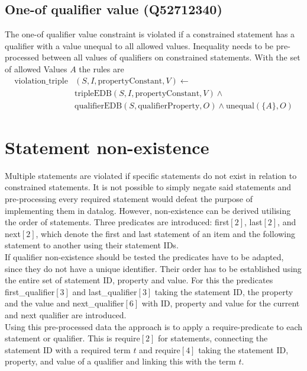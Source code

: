 \documentclass[hyperref,bachelorofscience,fleqn]{cgvpub}
\begin{document}
\subsection{One-of qualifier value (Q52712340)}
The one-of qualifier value constraint is violated if a constrained statement has a qualifier with a value unequal to all allowed values. Inequality needs to be pre-processed between all values of qualifiers on constrained statements. With the set of allowed Values \(A\) the rules are
\begin{equation*}
\begin{split}
\text{violation\_triple}&(S, I, \text{propertyConstant}, V) \leftarrow \\
&\text{tripleEDB}(S, I, \text{propertyConstant}, V) \wedge \\
&\text{qualifierEDB}(S, \text{qualifierProperty}, O) \wedge \text{unequal}(\{A\}, O)
\end{split}
\end{equation*}

\section{Statement non-existence}\label{sec_statement_non-existence}
Multiple statements are violated if specific statements do not exist in relation to constrained statements. It is not possible to simply negate said statements and pre-processing every required statement would defeat the purpose of implementing them in datalog. However, non-existence can be derived utilising the order of statements. Three predicates are introduced: first\([2]\), last\([2]\), and next\([2]\), which denote the first and last statement of an item and the following statement to another using their statement IDs.\\

If qualifier non-existence should be tested the predicates have to be adapted, since they do not have a unique identifier. Their order has to be established using the entire set of statement ID, property and value. For this the predicates first\_qualifier\([3]\) and last\_qualifier\([3]\) taking the statement ID, the property and the value and next\_qualifier\([6]\) with ID, property and value for the current and next qualifier are introduced.\\

Using this pre-processed data the approach is to apply a require-predicate to each statement or qualifier. This is require\([2]\) for statements, connecting the statement ID with a required term \(t\) and require\([4]\) taking the statement ID, property, and value of a qualifier and linking this with the term \(t\).\\
\end{document}
